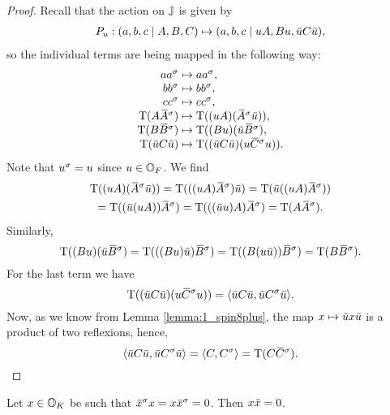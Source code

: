 \begin{proof}
	Recall that the action on $\mathbb{J}$ is given by
	\begin{equation*}
		\begin{array}{r@{\;}c@{\;}l}
			P_u : (a, b, c \mid A, B, C) & \mapsto & (a, b, c \mid u A, B u, \ovu C \ovu),
		\end{array}
	\end{equation*}
	so the individual terms are being mapped in the following way:
	\begin{equation*}
		\begin{array}{r@{\;}c@{\;}l}
			a a^{\s} & \mapsto & a a^{\s}, \\
			b b^{\s} & \mapsto & b b^{\s}, \\
			c c^{\s} & \mapsto & c c^{\s}, \\
			\Tr( A \ovA^{\s} ) & \mapsto & \Tr( (u A) (\ovA^{\s} \ovu) ), \\
			\Tr( B \ovB^{\s} ) & \mapsto & \Tr( (B u) (\ovu \ovB^{\s} ), \\
			\Tr( \ovu C \ovu ) & \mapsto & \Tr( (\ovu C \ovu) (u \ovC^{\s} u) ).
		\end{array}
	\end{equation*}
	Note that $u^{\sigma} = u$ since $u \in \mathbb{O}_F$. We find
	\begin{multline*}
		\Tr( (u A) (\ovA^{\s} \ovu) ) = \Tr( ((u A) \ovA^{\s}) \ovu ) = 
		\Tr( \ovu ((u A) \ovA^{\s}) ) \\
		= \Tr( ( \ovu (u A) ) \ovA^{\s} ) = 
		\Tr( ( (\ovu u) A ) \ovA^{\s} ) = \Tr(A \ovA^{\s}).
	\end{multline*}
	Similarly,
	\begin{equation*}
		 \Tr( (B u) (\ovu \ovB^{\s} ) = \Tr( ((B u) \ovu ) \ovB^{\s} ) = 
		 \Tr( (B (u \ovu) ) \ovB^{\s} ) = \Tr(B \ovB^{\s}).
	\end{equation*}
	For the last term we have
	\begin{equation*}
		\Tr( (\ovu C \ovu) (u \ovC^{\s} u) ) = \inner{\ovu C \ovu}{\ovu C^{\s} \ovu}.
	\end{equation*}
	Now, as we know from Lemma \ref{lemma:1_spin8plus}, the map $x \mapsto \ovu x \ovu$ is
	a product of two reflexions, hence,  
	\begin{equation*}
		\inner{\ovu C \ovu}{\ovu C^{\s} \ovu} = \inner{C}{C^{\s}} = \Tr(C\ovC^{\s}).
	\end{equation*}
\end{proof}

\begin{lemma}
	\label{lemma:3_isotropic}
	Let $x \in \mathbb{O}_K$ be such that $\ovx^{\s} x = x \ovx^{\s} = 0$. Then $x\mathord{\mbox{\hspace*{0pt}}\,\overline{\!x\!\!\;}\!\:}\mbox{\hspace*{0pt}} = 0$.
\end{lemma}

